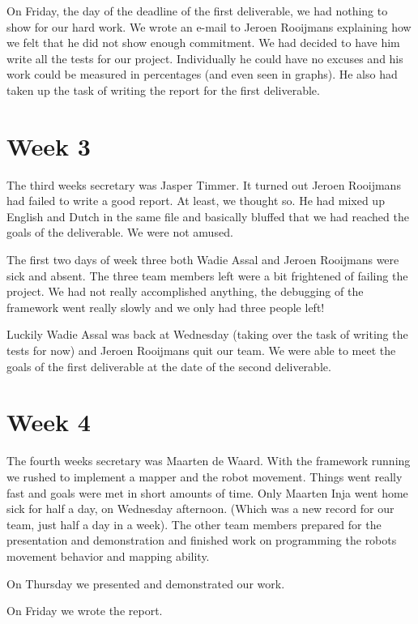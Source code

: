 \documentclass[a4paper,10pt]{article}
\begin{document}
On Friday, the day of the deadline of the first deliverable, we had nothing to show for our hard work. We wrote
an e-mail to Jeroen Rooijmans explaining how we felt that he did not show enough commitment. We had decided to 
have him write all the tests for our project. Individually he could have no excuses and his work could be measured
in percentages (and even seen in graphs). He also had taken up the task of writing the report for the first deliverable. 

\section{Week 3}
The third weeks secretary was Jasper Timmer. 
It turned out Jeroen Rooijmans had failed to write a good report. At least, we thought so. He had mixed up English 
and Dutch in the same file and basically bluffed that we had reached the goals of the deliverable. We were not amused. 

The first two days of week three both Wadie Assal and Jeroen Rooijmans were sick and absent. The three team members left
were a bit frightened of failing the project. We had not really accomplished anything, the debugging of the framework
went really slowly and we only had three people left! 

Luckily Wadie Assal was back at Wednesday (taking over the task of writing the tests for now) and Jeroen Rooijmans quit our team. 
We were able to meet the goals of the first deliverable at the date of 
the second deliverable. 

\section{Week 4}
The fourth weeks secretary was Maarten de Waard. With the framework running we rushed to implement a mapper and 
the robot movement. Things went really fast and goals were met in short amounts of time. Only Maarten Inja 
went home sick for half a day, on Wednesday afternoon. (Which was a new record for our team, just half a day in a week).
The other team members prepared for the presentation and demonstration and finished work on programming the robots
movement behavior and mapping ability.

On Thursday we presented and demonstrated our work. 

On Friday we wrote the report. 
\end{document}
